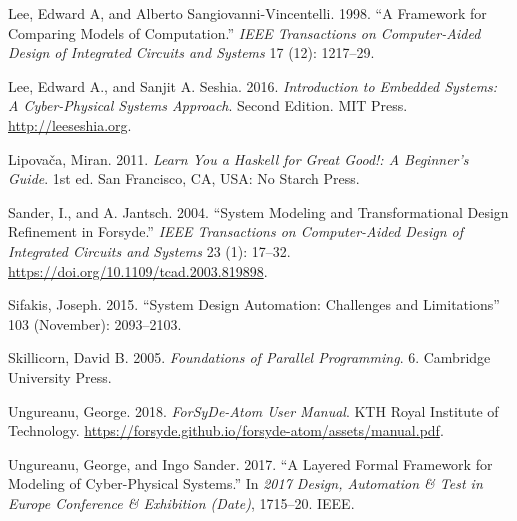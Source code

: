 \documentclass[
  a4paper,
]{article}
\begin{document}
\leavevmode\hypertarget{ref-lee98}{}%
Lee, Edward A, and Alberto Sangiovanni-Vincentelli. 1998. ``A Framework
for Comparing Models of Computation.'' \emph{IEEE Transactions on
Computer-Aided Design of Integrated Circuits and Systems} 17 (12):
1217--29.

\leavevmode\hypertarget{ref-leeseshia-15}{}%
Lee, Edward A., and Sanjit A. Seshia. 2016. \emph{Introduction to
Embedded Systems: A Cyber-Physical Systems Approach}. Second Edition.
MIT Press. \url{http://leeseshia.org}.

\leavevmode\hypertarget{ref-Lipovaca11}{}%
Lipovača, Miran. 2011. \emph{Learn You a Haskell for Great Good!: A
Beginner's Guide}. 1st ed. San Francisco, CA, USA: No Starch Press.

\leavevmode\hypertarget{ref-sander-2004}{}%
Sander, I., and A. Jantsch. 2004. ``System Modeling and Transformational
Design Refinement in Forsyde.'' \emph{IEEE Transactions on
Computer-Aided Design of Integrated Circuits and Systems} 23 (1):
17--32. \url{https://doi.org/10.1109/tcad.2003.819898}.

\leavevmode\hypertarget{ref-Sifakis15}{}%
Sifakis, Joseph. 2015. ``System Design Automation: Challenges and
Limitations'' 103 (November): 2093--2103.

\leavevmode\hypertarget{ref-skillicorn05}{}%
Skillicorn, David B. 2005. \emph{Foundations of Parallel Programming}.
6. Cambridge University Press.

\leavevmode\hypertarget{ref-atom-manual}{}%
Ungureanu, George. 2018. \emph{ForSyDe-Atom User Manual}. KTH Royal
Institute of Technology.
\url{https://forsyde.github.io/forsyde-atom/assets/manual.pdf}.

\leavevmode\hypertarget{ref-ungureanu17}{}%
Ungureanu, George, and Ingo Sander. 2017. ``A Layered Formal Framework
for Modeling of Cyber-Physical Systems.'' In \emph{2017 Design,
Automation \& Test in Europe Conference \& Exhibition (Date)}, 1715--20.
IEEE.
\end{document}

